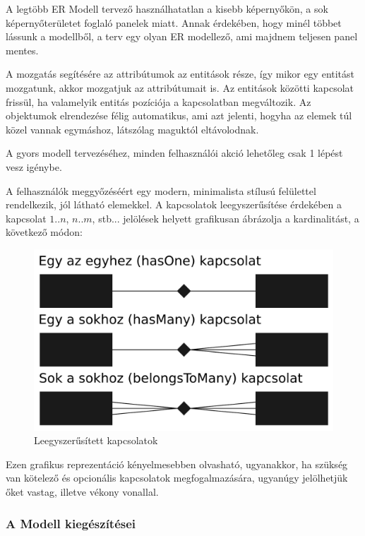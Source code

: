 \documentclass[a4paper,12pt,oneside]{report}
\begin{document}
\begin{justify}

	A legtöbb ER Modell tervező használhatatlan a kisebb képernyőkön, a sok képernyőterületet foglaló panelek miatt. Annak érdekében, hogy minél többet lássunk a modellből, a terv egy olyan ER modellező, ami majdnem teljesen panel mentes. 

	A mozgatás segítésére az attribútumok az entitások része, így mikor egy entitást mozgatunk, akkor mozgatjuk az attribútumait is. Az entitások közötti kapcsolat frissül, ha valamelyik entitás pozíciója a kapcsolatban megváltozik. Az objektumok elrendezése félig automatikus, ami azt jelenti, hogyha az elemek túl közel vannak egymáshoz, látszólag maguktól eltávolodnak.

	A gyors modell tervezéséhez, minden felhasználói akció lehetőleg csak 1 lépést vesz igénybe.

	A felhasználók meggyőzéséért egy modern, minimalista stílusú felülettel rendelkezik, jól látható elemekkel. A kapcsolatok leegyszerűsítése érdekében a kapcsolat $1..n$, $n..m$, stb... jelölések helyett grafikusan ábrázolja a kardinalitást, a következő módon:

    \begin{figure}[h]
        \centering
		\includegraphics[width=12cm]{contents/images/simplified_relations.png}
		\caption{Leegyszerűsített kapcsolatok}
		\label{fig:simplified_relations}
	\end{figure}

	Ezen grafikus reprezentáció kényelmesebben olvasható, ugyanakkor, ha szükség van kötelező és opcionális kapcsolatok megfogalmazására, ugyanúgy jelölhetjük őket vastag, illetve vékony vonallal. 

\end{justify}

\newpage
\subsubsection{A Modell kiegészítései }
\end{document}
